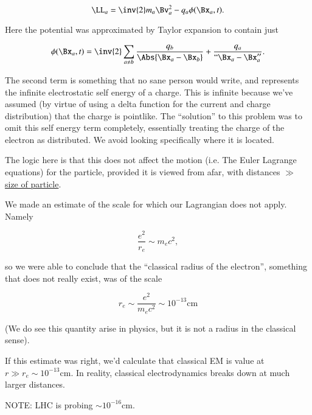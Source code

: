 \begin{equation}\label{eqn:relativisticElectrodynamicsL25:10}
\LL_a = \inv{2} m_a \Bv_a^2 - q_a \phi(\Bx_a, t).
\end{equation}

Here the potential was approximated by Taylor expansion to contain just

\begin{equation}\label{eqn:relativisticElectrodynamicsL25:30}
\phi(\Bx_a, t) = \inv{2} \sum_{a \ne b} \frac{q_b }{\Abs{\Bx_a - \Bx_b}}
+ \frac{q_a}{``\Bx_a - \Bx_a''}.
\end{equation}

The second term is something that no sane person would write, and represents the infinite electrostatic self energy of a charge.  This is infinite because we've assumed (by virtue of using a delta function for the current and charge distribution) that the charge is pointlike.  The ``solution'' to this problem was to omit this self energy term completely, essentially treating the charge of the electron as distributed.  We avoid looking specifically where it is located.

The logic here is that this does not affect the motion (i.e. The Euler Lagrange equations) for the particle, provided it is viewed from afar, with distances $\gg$ \underline{size of particle}.

We made an estimate of the scale for which our Lagrangian does not apply.  Namely

\begin{equation}\label{eqn:relativisticElectrodynamicsL25:50}
\frac{e^2}{r_e} \sim m_e c^2,
\end{equation}

so we were able to conclude that the ``classical radius of the electron'', something that does not really exist, was of the scale

\begin{equation}\label{eqn:relativisticElectrodynamicsL25:70}
r_e \sim \frac{e^2 }{m_e c^2} \sim 10^{-13} \text{cm}
\end{equation}

(We do see this quantity arise in physics, but it is not a radius in the classical sense).

If this estimate was right, we'd calculate that classical EM is value at $r \gg r_e \sim 10^{-13} \text{cm}$.  In reality, classical electrodynamics breaks down at much larger distances.

NOTE: LHC is probing $\sim 10^{-16} \text{cm}$.

